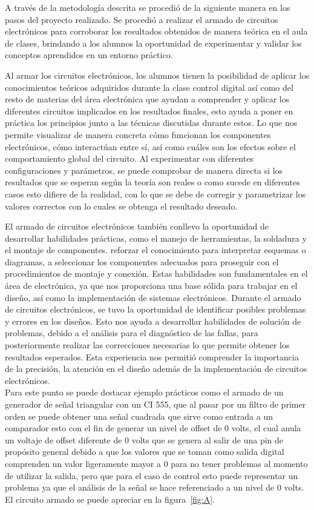 \documentclass[a4paper,12pt]{article}
\begin{document}
        A través de la metodología descrita se procedió de la siguiente manera en los pasos del proyecto realizado.
        Se procedió a realizar el armado de circuitos electrónicos para corroborar los resultados obtenidos de manera teórica en el aula de clases, brindando a los alumnos la oportunidad de experimentar y validar los conceptos aprendidos en un entorno práctico.

        Al armar los circuitos electrónicos, los alumnos tienen la posibilidad de aplicar los conocimientos teóricos adquiridos durante la clase control digital así como del resto de materias del área electrónica que ayudan a comprender y aplicar los diferentes circuitos implicados en los resultados finales, esto ayuda a poner en práctica los principios junto a las técnicas discutidas durante estos. Lo que nos permite visualizar de manera concreta cómo funcionan los componentes electrónicos, cómo interactúan entre sí, así como cuáles son los efectos sobre el comportamiento global del circuito. Al experimentar con diferentes configuraciones y parámetros, se puede comprobar de manera directa si los resultados que se esperan según la teoría son reales o como sucede en diferentes casos esto difiere de la realidad, con lo que se debe de corregir y parametrizar los valores correctos con lo cuales se obtenga el resultado deseado.

        El armado de circuitos electrónicos también conllevo la oportunidad de desarrollar habilidades prácticas, como el manejo de herramientas, la soldadura y el montaje de componentes. reforzar el conocimiento para interpretar esquemas o diagramas, a seleccionar los componentes adecuados para proseguir con el procedimientos de montaje y conexión. Estas habilidades son fundamentales en el área de  electrónica, ya que nos proporciona una base sólida para trabajar en el diseño, así como la implementación de sistemas electrónicos.
        Durante el armado de circuitos electrónicos, se tuvo la oportunidad de identificar posibles problemas y errores en los diseños. Esto nos ayuda a desarrollar habilidades de solución de problemas, debido a el análisis para el diagnóstico de  las fallas, para posteriormente realizar las correcciones necesarias lo que permite  obtener los resultados esperados. Esta experiencia nos permitió comprender la importancia de la precisión, la atención en el diseño además de la implementación de circuitos electrónicos.\\
        Para este punto se puede destacar ejemplo prácticos como el armado de un generador de señal triangular con un CI 555, que al pasar por un filtro de primer orden se puede obtener una señal cuadrada que sirve como entrada a un comparador esto con el fin de generar un nivel de offset de 0 volts, el cual anula un voltaje de offset diferente de 0 volts que se genera al salir de una pin de propósito general debido a que los valores que se toman como salida digital comprenden un valor ligeramente mayor a 0 para no tener problemas al momento de utilizar la salida, pero que para el caso de control esto puede representar un problema ya que el análisis de la señal se hace referenciado a un nivel de 0 volts. 
        El circuito armado se puede apreciar en la figura~\ref{fig:A}.
\end{document}
